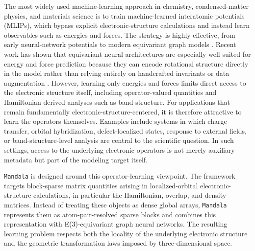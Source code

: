 \documentclass[preprint,12pt,compress,numafflabel]{elsarticle}
\begin{document}
The most widely used machine-learning approach in chemistry, condensed-matter physics, and materials science is to train machine-learned interatomic potentials (MLIPs), which bypass explicit electronic-structure calculations and instead learn observables such as energies and forces. The strategy is highly effective, from early neural-network potentials to modern equivariant graph models \cite{BehlerParrinello2007,BartokGAP2010,ZhangDeepMD2018,BatznerNequIP2022,BatatiaMACE2022}. Recent work has shown that equivariant neural architectures are especially well suited for energy and force prediction because they can encode rotational structure directly in the model rather than relying entirely on handcrafted invariants or data augmentation \cite{KoKoBe22,BatznerMusaelianKozinskyNRP2023,KoOngNatCompSci2023}. However, learning only energies and forces limits direct access to the electronic structure itself, including operator-valued quantities and Hamiltonian-derived analyses such as band structure. For applications that remain fundamentally electronic-structure-centered, it is therefore attractive to learn the operators themselves.
Examples include systems in which charge transfer, orbital hybridization, defect-localized states, response to external fields, or band-structure-level analysis are central to the scientific question. In such settings, access to the underlying electronic operators is not merely auxiliary metadata but part of the modeling target itself.

\texttt{Mandala} is designed around this operator-learning viewpoint. The framework targets block-sparse matrix quantities arising in localized-orbital electronic-structure calculations, in particular the Hamiltonian, overlap, and density matrices. Instead of treating these objects as dense global arrays, \texttt{Mandala} represents them as atom-pair-resolved sparse blocks and combines this representation with E(3)-equivariant graph neural networks. The resulting learning problem respects both the locality of the underlying electronic structure and the geometric transformation laws imposed by three-dimensional space.
\end{document}
